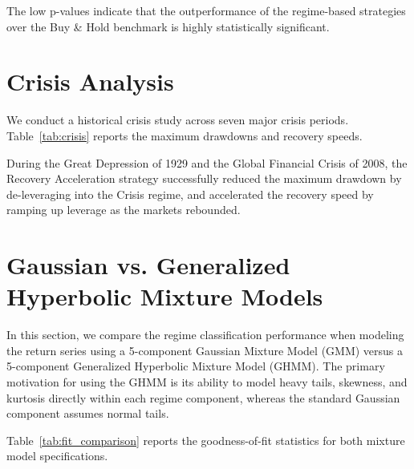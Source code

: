 \documentclass[11pt]{article}
\begin{document}
The low p-values indicate that the outperformance of the regime-based strategies over the Buy \& Hold benchmark is highly statistically significant.

\section{Crisis Analysis}
We conduct a historical crisis study across seven major crisis periods. Table~\ref{tab:crisis} reports the maximum drawdowns and recovery speeds.


During the Great Depression of 1929 and the Global Financial Crisis of 2008, the Recovery Acceleration strategy successfully reduced the maximum drawdown by de-leveraging into the Crisis regime, and accelerated the recovery speed by ramping up leverage as the markets rebounded.

\section{Gaussian vs. Generalized Hyperbolic Mixture Models}
In this section, we compare the regime classification performance when modeling the return series using a 5-component Gaussian Mixture Model (GMM) versus a 5-component Generalized Hyperbolic Mixture Model (GHMM). The primary motivation for using the GHMM is its ability to model heavy tails, skewness, and kurtosis directly within each regime component, whereas the standard Gaussian component assumes normal tails.

Table~\ref{tab:fit_comparison} reports the goodness-of-fit statistics for both mixture model specifications.
\end{document}
